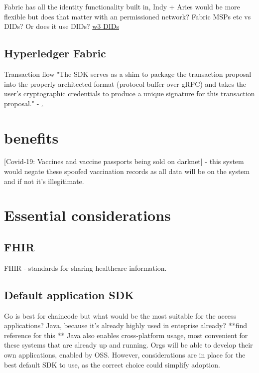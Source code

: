 \documentclass{report}
\begin{document}
\begin{flushleft}
Fabric has all the identity functionality built in, Indy + Aries would be more flexible but does that matter with an permissioned network? Fabric MSPs etc vs DIDs? Or does it use DIDs? \href{'https://www.w3.org/TR/did-core/'}{w3 DIDs}

\section{Hyperledger Fabric}
Transaction flow "The SDK serves as a shim to package the transaction proposal into the properly architected format (protocol buffer over gRPC) and takes the user’s cryptographic credentials to produce a unique signature for this transaction proposal." - \href{"https://hyperledger-fabric.readthedocs.io/en/latest/txflow.html'}.\linebreak[1]



\chapter{benefits}
[Covid-19: Vaccines and vaccine passports being sold on darknet] - this system would negate these spoofed vaccination records as all data will be on the system and if not it's illegitimate.
\linebreak[3]

\chapter{Essential considerations}
\section{FHIR}
FHIR - standards for sharing healthcare information.\linebreak[1]

\section{Default application SDK}
Go is best for chaincode but what would be the most suitable for the access applications? Java, because it's already highly used in enteprise already? **find reference for this ** Java also enables cross-platform usage, most convenient for these systems that are already up and running.
Orgs will be able to develop their own applications, enabled by OSS. However, considerations are in place for the best default SDK to use, as the correct choice could simplify adoption.


\end{flushleft}
\end{document}
